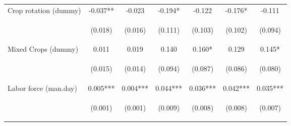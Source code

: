 \begin{center}
\begin{tabular}{lcccccc}
Crop rotation (dummy) & -0.037** & -0.023 & -0.194* & -0.122 & -0.176* & -0.111 \\
\vspace{4pt} & \begin{footnotesize}(0.018)\end{footnotesize} & \begin{footnotesize}(0.016)\end{footnotesize} & \begin{footnotesize}(0.111)\end{footnotesize} & \begin{footnotesize}(0.103)\end{footnotesize} & \begin{footnotesize}(0.102)\end{footnotesize} & \begin{footnotesize}(0.094)\end{footnotesize} \\
Mixed Crops (dummy) & 0.011 & 0.019 & 0.140 & 0.160* & 0.129 & 0.145* \\
\vspace{4pt} & \begin{footnotesize}(0.015)\end{footnotesize} & \begin{footnotesize}(0.014)\end{footnotesize} & \begin{footnotesize}(0.094)\end{footnotesize} & \begin{footnotesize}(0.087)\end{footnotesize} & \begin{footnotesize}(0.086)\end{footnotesize} & \begin{footnotesize}(0.080)\end{footnotesize} \\
Labor force (man.day) & 0.005*** & 0.004*** & 0.044*** & 0.036*** & 0.042*** & 0.035*** \\
\vspace{4pt} & \begin{footnotesize}(0.001)\end{footnotesize} & \begin{footnotesize}(0.001)\end{footnotesize} & \begin{footnotesize}(0.009)\end{footnotesize} & \begin{footnotesize}(0.008)\end{footnotesize} & \begin{footnotesize}(0.008)\end{footnotesize} & \begin{footnotesize}(0.007)\end{footnotesize} \\

\end{tabular}
\end{center}

